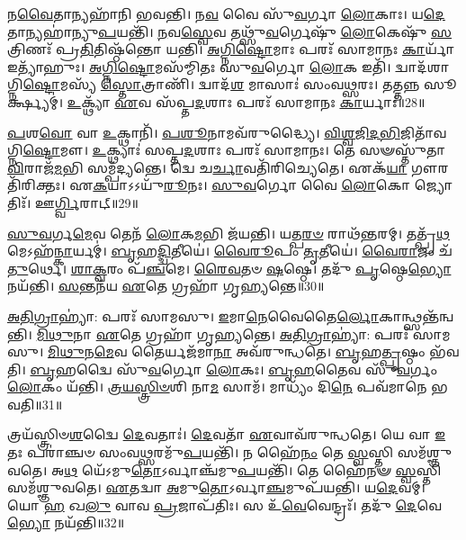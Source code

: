 𑌨\-\ul{𑌵𑍈}\-𑌤𑌾𑌨𑍍𑌯𑌹𑌾᳴𑌨𑌿 𑌭𑌵𑌨𑍍𑌤𑌿।
𑌨\-\ul{𑌵} 𑌵𑍈 𑌸𑍁᳴\-\ul{𑌵}\-𑌰𑍍𑌗𑌾 \ul{𑌲𑍋}\-𑌕𑌾𑌃।
𑌯\-\ul{𑌦𑍇}\-𑌤𑌾𑌨𑍍𑌯𑌹𑌾॑𑌨𑍍𑌯𑍁\-\ul{𑌪}\-𑌯𑌨𑍍𑌤𑌿᳴।
\-\ul{𑌨}\-𑌵\-\ul{𑌸𑍍𑌵𑍇}\-𑌵 𑌤𑌥𑍍𑌸𑍁᳴\-\ul{𑌵}\-𑌰𑍍𑌗𑍇𑌷𑍁᳴ \ul{𑌲𑍋}\-𑌕𑍇𑌷𑍁᳴ \ul{𑌸}\-𑌤𑍍𑌰𑌿𑌣𑌃᳴ 𑌪𑍍𑌰\-\ul{𑌤𑌿}\-𑌤𑌿𑌷𑍍𑌠᳴𑌨𑍍𑌤𑍋 𑌯𑌨𑍍𑌤𑌿।
\-\ul{𑌅}\-\-\ul{𑌗𑍍𑌨𑌿}\-\-\ul{𑌷𑍍𑌟𑍋}\-𑌮𑌾𑌃 𑌪𑌰𑌃᳴ 𑌸𑌾𑌮𑌾𑌨𑌃 \ul{𑌕𑌾}\-𑌰𑍍𑌯𑌾᳴ 𑌇𑌤𑍍𑌯𑌾᳴𑌹𑍁𑌃।
\-\ul{𑌅}\-\-\ul{𑌗𑍍𑌨𑌿}\-\-\ul{𑌷𑍍𑌟𑍋}\-𑌮𑌸᳴𑌮𑍍𑌮𑌿𑌤𑌃 𑌸𑍁\-\ul{𑌵}\-𑌰𑍍𑌗𑍋 \ul{𑌲𑍋}\-𑌕 𑌇𑌤𑌿᳴।
𑌦𑍍𑌵𑌾𑌦᳴𑌶𑌾𑌗𑍍𑌨𑌿\-\ul{𑌷𑍍𑌟𑍋}\-𑌮𑌸𑍍𑌯᳴ \ul{𑌸𑍍𑌤𑍋}\-𑌤𑍍𑌰𑌾𑌣𑌿᳴।
𑌦𑍍𑌵𑌾𑌦᳴\-\ul{𑌶} 𑌮𑌾𑌸𑌾𑌃॑ 𑌸𑌂𑌵\-\ul{𑌥𑍍𑌸}\-𑌰𑌃।
𑌤𑌤𑍍𑌤𑌨𑍍𑌨 𑌸𑍂𑌰𑍍𑌕𑍍𑌷𑍍𑌯𑌮𑍍॑।
\-\ul{𑌉}\-𑌕𑍍𑌥𑍍𑌯𑌾᳴ \ul{𑌏}\-𑌵 𑌸᳴𑌪𑍍𑌤\-\ul{𑌦}\-𑌶𑌾𑌃 𑌪𑌰𑌃᳴ 𑌸𑌾𑌮𑌾𑌨𑌃 \ul{𑌕𑌾}\-𑌰𑍍𑌯𑌾𑌃॑॥28॥

\-\ul{𑌪}\-𑌶\-\ul{𑌵𑍋} 𑌵𑌾 \ul{𑌉}\-𑌕𑍍𑌥𑌾𑌨𑌿᳴।
\-\ul{𑌪}\-\-\ul{𑌶𑍂}\-𑌨𑌾𑌮𑌵᳴𑌰𑍁𑌦𑍍𑌧𑍍𑌯𑍈।
\-\ul{𑌵𑌿}\-\-\ul{𑌶𑍍𑌵}\-\-\ul{𑌜𑌿}\-\-\ul{𑌦}\-\-\ul{𑌭𑌿}\-𑌜𑌿𑌤𑌾᳴\-𑌵𑌗𑍍𑌨𑌿\-\ul{𑌷𑍍𑌟𑍋}\-𑌮𑍗।
\-\ul{𑌉}\-𑌕𑍍𑌥𑍍𑌯𑌾𑌃॑ 𑌸𑌪𑍍𑌤\-\ul{𑌦}\-𑌶𑌾𑌃 𑌪𑌰𑌃᳴ 𑌸𑌾𑌮𑌾𑌨𑌃।
𑌤𑍇 𑌸𑍟𑌸𑍍𑌤𑍁᳴𑌤𑌾 \ul{𑌵𑌿}\-𑌰𑌾𑌜᳴\-\ul{𑌮}\-𑌭𑌿 𑌸𑌮𑍍𑌪᳴𑌦𑍍𑌯𑌨𑍍𑌤𑍇।
𑌦𑍍𑌵𑍇 𑌚\-\ul{𑌰𑍍𑌚𑌾}\-𑌵𑌤𑌿᳴𑌰𑌿𑌚𑍍𑌯𑍇𑌤𑍇।
𑌏𑌕᳴\-\ul{𑌯𑌾} 𑌗𑍗𑌰𑌤𑌿᳴𑌰𑌿𑌕𑍍𑌤𑌃।
𑌏\-\ul{𑌕}\-𑌯𑌾\-𑌽𑌽𑌯𑍁᳴\-\ul{𑌰𑍂}\-𑌨𑌃।
\-\ul{𑌸𑍁}\-\-\ul{𑌵}\-𑌰𑍍𑌗𑍋 𑌵𑍈 \ul{𑌲𑍋}\-𑌕𑍋 𑌜𑍍𑌯𑍋𑌤𑌿𑌃᳴।
𑌊\-\ul{𑌰𑍍𑌗𑍍𑌵𑌿}\-𑌰𑌾𑌟𑍍॥29॥

\-\ul{𑌸𑍁}\-\-\ul{𑌵}\-𑌰𑍍𑌗\-\ul{𑌮𑍇}\-𑌵 𑌤𑍇𑌨᳴ \ul{𑌲𑍋}\-𑌕\-\ul{𑌮}\-𑌭𑌿 𑌜᳴𑌯𑌨𑍍𑌤𑌿।
𑌯𑌤𑍍𑌪\-\ul{𑌰}\-\-\ul{𑍞} 𑌰𑌾𑌥᳴𑌨𑍍𑌤𑌰𑌮𑍍।
𑌤𑌤𑍍𑌪𑍍𑌰᳴\-\ul{𑌥}\-𑌮𑍇\-𑌽𑌹᳴\-\ul{𑌨𑍍𑌕𑌾}\-𑌰𑍍𑌯𑌮𑍍॑।
\-\ul{𑌬𑍃}\-𑌹\-\ul{𑌦𑍍𑌦𑍍𑌵𑌿}\-𑌤𑍀𑌯𑍇॑।
\-\ul{𑌵𑍈}\-\-\ul{𑌰𑍂}\-𑌪𑌂 \ul{𑌤𑍃}\-𑌤𑍀𑌯𑍇॑।
\-\ul{𑌵𑍈}\-\-\ul{𑌰𑌾}\-𑌜𑌂 𑌚᳴\-\ul{𑌤𑍁}\-𑌰𑍍𑌥𑍇।
\-\ul{𑌶𑌾}\-\-\ul{𑌕𑍍𑌵}\-𑌰𑌂 𑌪᳴\-\ul{𑌞𑍍𑌚}\-𑌮𑍇।
\-\ul{𑌰𑍈}\-\-\ul{𑌵}\-𑌤𑍞 \ul{𑌷}\-𑌷𑍍𑌠𑍇।
𑌤𑌦𑍁᳴ \ul{𑌪𑍃}\-𑌷𑍍𑌠𑍇\-\ul{𑌭𑍍𑌯𑍋} 𑌨𑌯᳴𑌨𑍍𑌤𑌿।
\-\ul{𑌸}\-𑌨𑍍𑌤𑌨᳴𑌯 \ul{𑌏}\-𑌤𑍇 𑌗𑍍𑌰𑌹𑌾᳴ 𑌗𑍃𑌹𑍍𑌯𑌨𑍍𑌤𑍇॥30॥

\-\ul{𑌅}\-\-\ul{𑌤𑌿}\-\-\ul{𑌗𑍍𑌰𑌾}\-𑌹𑍍𑌯𑌾॑: 𑌪𑌰𑌃᳴ 𑌸𑌾𑌮𑌸𑍁।
\-\ul{𑌇}\-𑌮𑌾\-\ul{𑌨𑍇}\-𑌵𑍈𑌤𑍈\-\ul{𑌰𑍍𑌲𑍋}\-𑌕𑌾𑌨𑍍𑌥𑍍𑌸𑌨𑍍𑌤᳴𑌨𑍍𑌵𑌨𑍍𑌤𑌿।
\-\ul{𑌮𑌿}\-\-\ul{𑌥𑍁}\-𑌨𑌾 \ul{𑌏}\-𑌤𑍇 𑌗𑍍𑌰𑌹𑌾᳴ 𑌗𑍃𑌹𑍍𑌯𑌨𑍍𑌤𑍇।
\-\ul{𑌅}\-\-\ul{𑌤𑌿}\-\-\ul{𑌗𑍍𑌰𑌾}\-𑌹𑍍𑌯𑌾॑: 𑌪𑌰𑌃᳴ 𑌸𑌾𑌮𑌸𑍁।
\-\ul{𑌮𑌿}\-\-\ul{𑌥𑍁}\-𑌨\-\ul{𑌮𑍇}\-𑌵 𑌤𑍈𑌰𑍍𑌯𑌜᳴𑌮𑌾\-\ul{𑌨𑌾} 𑌅𑌵᳴𑌰𑍁𑌨𑍍𑌧𑌤𑍇।
\-\ul{𑌬𑍃}\-𑌹\-\ul{𑌤𑍍𑌪𑍃}\-𑌷𑍍𑌠𑌂 𑌭᳴𑌵𑌤𑌿।
\-\ul{𑌬𑍃}\-𑌹𑌦𑍍𑌵𑍈 𑌸𑍁᳴\-\ul{𑌵}\-𑌰𑍍𑌗𑍋 \ul{𑌲𑍋}\-𑌕𑌃।
\-\ul{𑌬𑍃}\-\-\ul{𑌹}\-𑌤𑍈𑌵 𑌸𑍁᳴\-\ul{𑌵}\-𑌰𑍍𑌗𑌂 \ul{𑌲𑍋}\-𑌕𑌂 𑌯᳴𑌨𑍍𑌤𑌿।
\-\ul{𑌤𑍍𑌰}\-\-\ul{𑌯}\-\-\ul{𑌸𑍍𑌤𑍍𑌰𑌿}\-\-\ul{𑍞}\-𑌶𑌿  𑌨𑌾\-\ul{𑌮} 𑌸𑌾𑌮᳴।
𑌮𑌾𑌧𑍍𑌯𑌂᳴ 𑌦𑌿\-\ul{𑌨𑍇} 𑌪𑌵᳴𑌮𑌾𑌨𑍇 𑌭𑌵𑌤𑌿॥31॥

𑌤𑍍𑌰𑌯᳴𑌸𑍍𑌤𑍍𑌰𑌿𑍞\-\ul{𑌶}\-𑌦𑍍𑌵𑍈 \ul{𑌦𑍇}\-𑌵𑌤𑌾𑌃॑।
\-\ul{𑌦𑍇}\-𑌵𑌤𑌾᳴ \ul{𑌏}\-𑌵𑌾𑌵᳴𑌰𑍁𑌨𑍍𑌧𑌤𑍇।
𑌯𑍇 𑌵𑌾 \ul{𑌇}\-𑌤𑌃 𑌪𑌰𑌾॑𑌞𑍍𑌚𑍞 𑌸𑌂𑌵\-\ul{𑌥𑍍𑌸}\-𑌰𑌮𑍁᳴\-\ul{𑌪}\-𑌯𑌨𑍍𑌤𑌿᳴।
𑌨 𑌹𑍈᳴\-\ul{𑌨𑌂} 𑌤𑍇 \ul{𑌸𑍍𑌵}\-𑌸𑍍𑌤𑌿 𑌸𑌮᳴𑌶𑍍𑌞𑍁𑌵𑌤𑍇।
𑌅\-\ul{𑌥} 𑌯𑍇᳴\-𑌽𑌮𑍁\-\ul{𑌤𑍋}\-\-𑌽𑌰𑍍𑌵𑌾𑌞𑍍𑌚᳴𑌮𑍁\-\ul{𑌪}\-𑌯𑌨𑍍𑌤𑌿᳴।
𑌤𑍇 𑌹𑍈᳴𑌨𑍟 \ul{𑌸𑍍𑌵}\-𑌸𑍍𑌤𑌿 𑌸𑌮᳴𑌶𑍍𑌞𑍁𑌵𑌤𑍇।
\-\ul{𑌏}\-𑌤𑌦𑍍𑌵𑌾 \ul{𑌅}\-𑌮𑍁\-\ul{𑌤𑍋}\-\-𑌽𑌰𑍍𑌵𑌾\-\ul{𑌞𑍍𑌚}\-𑌮𑍁𑌪᳴𑌯𑌨𑍍𑌤𑌿।
𑌯\-\ul{𑌦𑍇}\-𑌵𑌮𑍍।
𑌯𑍋 \ul{𑌹} 𑌖\-\ul{𑌲𑍁} 𑌵𑌾𑌵 \ul{𑌪𑍍𑌰}\-𑌜𑌾\-𑌪᳴𑌤𑌿𑌃।
𑌸 𑌉᳴\-\ul{𑌵𑍇}\-𑌵𑍇𑌨𑍍𑌦𑍍𑌰𑌃᳴।
𑌤𑌦𑍁᳴ \ul{𑌦𑍇}\-𑌵𑍇\-\ul{𑌭𑍍𑌯𑍋} 𑌨𑌯᳴𑌨𑍍𑌤𑌿॥32॥\anuvakamend[\-\ul{𑌕𑌾}\-𑌰𑍍𑌯𑌾᳴ \ul{𑌵𑌿}\-𑌰𑌾𑌡𑍍𑌗𑍃᳴𑌹𑍍𑌯\-\ul{𑌨𑍍𑌤𑍇} 𑌪𑌵᳴𑌮𑌾𑌨𑍇 𑌭\-\ul{𑌵}\-𑌤𑍀\-\ul{𑌨𑍍𑌦𑍍𑌰} 𑌏𑌕𑌂᳴ 𑌚]

